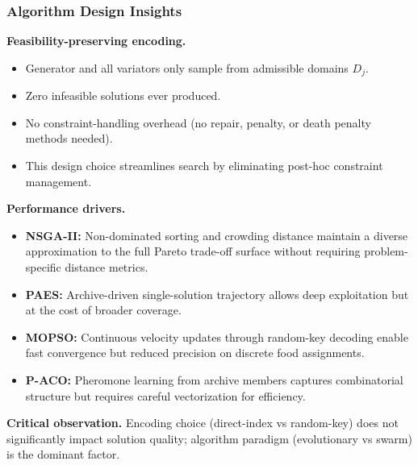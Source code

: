 \documentclass[aspectratio=169,10pt]{beamer}
\begin{document}
\begin{frame}
\frametitle{Algorithm Design Insights}

\textbf{Feasibility-preserving encoding.}
\begin{itemize}
  \item Generator and all variators only sample from admissible domains $D_j$.
  \item Zero infeasible solutions ever produced.
  \item No constraint-handling overhead (no repair, penalty, or death penalty methods needed).
  \item This design choice streamlines search by eliminating post-hoc constraint management.
\end{itemize}

\vspace{0.3cm}

\textbf{Performance drivers.}
\begin{itemize}
  \item \textbf{NSGA-II:} Non-dominated sorting and crowding distance maintain a diverse approximation to the full Pareto trade-off surface without requiring problem-specific distance metrics.
  \item \textbf{PAES:} Archive-driven single-solution trajectory allows deep exploitation but at the cost of broader coverage.
  \item \textbf{MOPSO:} Continuous velocity updates through random-key decoding enable fast convergence but reduced precision on discrete food assignments.
  \item \textbf{P-ACO:} Pheromone learning from archive members captures combinatorial structure but requires careful vectorization for efficiency.
\end{itemize}

\vspace{0.2cm}

\textbf{Critical observation.} Encoding choice (direct-index vs random-key) does not significantly impact solution quality; algorithm paradigm (evolutionary vs swarm) is the dominant factor.

\end{frame}
\end{document}

